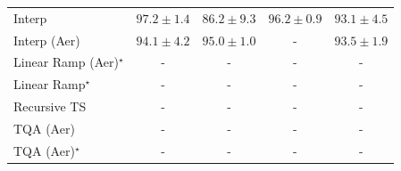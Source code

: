 \begin{tabular}{l|cccc|}
Interp & {\cellcolor[HTML]{802D05}} \color[HTML]{F1F1F1} $97.2\pm 1.4$ & {\cellcolor[HTML]{FEBB47}} \color[HTML]{000000} $86.2\pm 9.3$ & {\cellcolor[HTML]{933204}} \color[HTML]{F1F1F1} $96.2\pm 0.9$ & {\cellcolor[HTML]{CF5004}} \color[HTML]{F1F1F1} $93.1\pm 4.5$ \\
Interp (Aer) & {\cellcolor[HTML]{BC4503}} \color[HTML]{F1F1F1} $94.1\pm 4.2$ & {\cellcolor[HTML]{AB3C03}} \color[HTML]{F1F1F1} $95.0\pm 1.0$ & {\cellcolor[HTML]{000000}} \color[HTML]{F1F1F1} {\cellcolor{white}} \color{black} - & {\cellcolor[HTML]{C94B02}} \color[HTML]{F1F1F1} $93.5\pm 1.9$ \\
Linear Ramp (Aer)$^\star$ & {\cellcolor[HTML]{000000}} \color[HTML]{F1F1F1} {\cellcolor{white}} \color{black} - & {\cellcolor[HTML]{000000}} \color[HTML]{F1F1F1} {\cellcolor{white}} \color{black} - & {\cellcolor[HTML]{000000}} \color[HTML]{F1F1F1} {\cellcolor{white}} \color{black} - & {\cellcolor[HTML]{000000}} \color[HTML]{F1F1F1} {\cellcolor{white}} \color{black} - \\
Linear Ramp$^\star$ & {\cellcolor[HTML]{000000}} \color[HTML]{F1F1F1} {\cellcolor{white}} \color{black} - & {\cellcolor[HTML]{000000}} \color[HTML]{F1F1F1} {\cellcolor{white}} \color{black} - & {\cellcolor[HTML]{000000}} \color[HTML]{F1F1F1} {\cellcolor{white}} \color{black} - & {\cellcolor[HTML]{000000}} \color[HTML]{F1F1F1} {\cellcolor{white}} \color{black} - \\
Recursive TS & {\cellcolor[HTML]{000000}} \color[HTML]{F1F1F1} {\cellcolor{white}} \color{black} - & {\cellcolor[HTML]{000000}} \color[HTML]{F1F1F1} {\cellcolor{white}} \color{black} - & {\cellcolor[HTML]{000000}} \color[HTML]{F1F1F1} {\cellcolor{white}} \color{black} - & {\cellcolor[HTML]{000000}} \color[HTML]{F1F1F1} {\cellcolor{white}} \color{black} - \\
TQA (Aer) & {\cellcolor[HTML]{000000}} \color[HTML]{F1F1F1} {\cellcolor{white}} \color{black} - & {\cellcolor[HTML]{000000}} \color[HTML]{F1F1F1} {\cellcolor{white}} \color{black} - & {\cellcolor[HTML]{000000}} \color[HTML]{F1F1F1} {\cellcolor{white}} \color{black} - & {\cellcolor[HTML]{000000}} \color[HTML]{F1F1F1} {\cellcolor{white}} \color{black} - \\
TQA (Aer)$^\star$ & {\cellcolor[HTML]{000000}} \color[HTML]{F1F1F1} {\cellcolor{white}} \color{black} - & {\cellcolor[HTML]{000000}} \color[HTML]{F1F1F1} {\cellcolor{white}} \color{black} - & {\cellcolor[HTML]{000000}} \color[HTML]{F1F1F1} {\cellcolor{white}} \color{black} - & {\cellcolor[HTML]{000000}} \color[HTML]{F1F1F1} {\cellcolor{white}} \color{black} - \\

\end{tabular}
